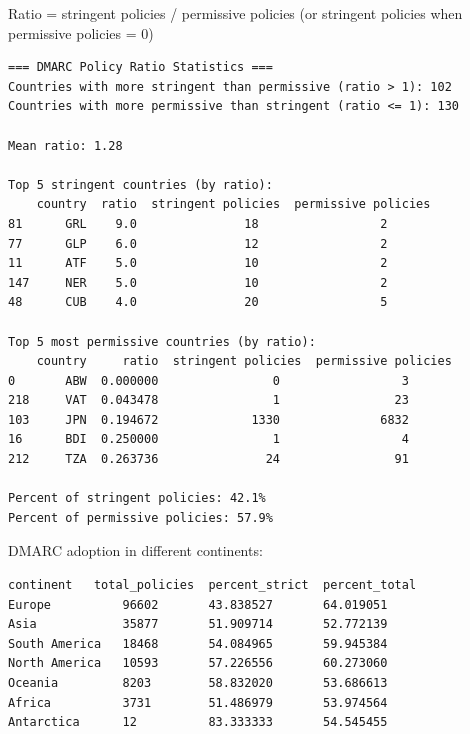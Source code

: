 Ratio = stringent policies / permissive policies (or stringent policies when permissive policies = 0)
\begin{verbatim}
=== DMARC Policy Ratio Statistics ===
Countries with more stringent than permissive (ratio > 1): 102
Countries with more permissive than stringent (ratio <= 1): 130

Mean ratio: 1.28

Top 5 stringent countries (by ratio):
    country  ratio  stringent policies  permissive policies
81      GRL    9.0               18                 2
77      GLP    6.0               12                 2
11      ATF    5.0               10                 2
147     NER    5.0               10                 2
48      CUB    4.0               20                 5

Top 5 most permissive countries (by ratio):
    country     ratio  stringent policies  permissive policies
0       ABW  0.000000                0                 3
218     VAT  0.043478                1                23
103     JPN  0.194672             1330              6832
16      BDI  0.250000                1                 4
212     TZA  0.263736               24                91

Percent of stringent policies: 42.1%
Percent of permissive policies: 57.9%
\end{verbatim}

DMARC adoption in different continents:
\begin{verbatim}
continent	total_policies	percent_strict	percent_total
Europe	        96602	    43.838527	    64.019051
Asia	        35877	    51.909714	    52.772139
South America	18468	    54.084965	    59.945384
North America	10593	    57.226556	    60.273060
Oceania	        8203	    58.832020	    53.686613
Africa	        3731	    51.486979	    53.974564
Antarctica	    12	        83.333333	    54.545455
\end{verbatim}


